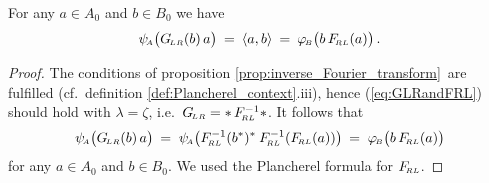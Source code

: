 \begin{lemma_sec} \label{lem:duality_revisited}
For any\/ $a \in A_0$ and\/ $b \in B_0$ we have
$$ \psiA\!\left(\GLR(b) \, a\vertM\right)
           \:=\: \pair{a}{b} \:=\:
   \phiB\!\left(b \, \FRL(a) \vertM\right). $$
\end{lemma_sec}
\begin{proof}
The conditions of proposition \ref{prop:inverse_Fourier_transform}\ are fulfilled
(cf.\ definition \ref{def:Plancherel_context}.iii),
hence (\ref{eq:GLRandFRL}) should hold with $\lambda=\zeta$,
i.e.\ $G_{\!\scriptscriptstyle LR} = *\,F_{\!\scriptscriptstyle RL}^{-1}*$. It follows that
$$ \psiA\!\left(\GLR(b) \, a\vertM\right)
  \:=\; \psiA\!\left(\FRL^{-1}(b^*)^* \: \FRL^{-1}(\FRL(a)) \vertM\right)
  \:=\; \phiB\!\left(b \, \FRL(a) \vertM\right)  $$
for any $a \in A_0$ and $b \in B_0$. We used the Plancherel formula for $F_{\!\scriptscriptstyle RL}$.
\end{proof}
